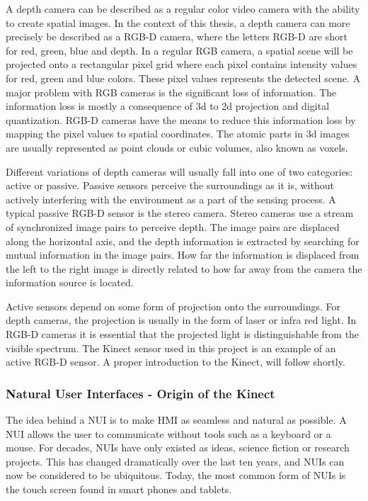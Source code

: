 A depth camera can be described as a regular color video camera with the ability to create spatial images. In the context of this thesis, a depth camera can  more precisely be described as a RGB-D camera, where the letters RGB-D are short for red, green, blue and depth. In a regular RGB camera, a spatial scene will be projected onto a rectangular pixel grid where each pixel contains intensity values for red, green and blue colors. These pixel values represents the detected scene. A major problem with RGB cameras is the significant loss of information. The information loss is mostly a consequence of 3d to 2d projection and digital quantization. RGB-D cameras have the means to reduce this information loss by mapping the pixel values to spatial coordinates. The atomic parts in 3d images are usually represented as point clouds or cubic volumes, also known as voxels.

Different variations of depth cameras will usually fall into one of two categories: active or passive. Passive sensors perceive the surroundings as it is, without actively interfering with the environment as a part of the sensing process. A typical passive RGB-D sensor is the stereo camera. Stereo cameras use a stream of synchronized image pairs to perceive depth. The image pairs are displaced along the horizontal axis, and the depth information is extracted by searching for mutual information in the image pairs. How far the information is displaced from the left to the right image is directly related to how far away from the camera the information source is located. 

Active sensors depend on some form of projection onto the surroundings. For depth cameras, the projection is usually in the form of laser or infra red light. In RGB-D cameras it is essential that the projected light is distinguishable from the visible spectrum. The Kinect sensor used in this project is an example of an active RGB-D sensor. A proper introduction to the Kinect, will follow shortly.

\subsubsection{Natural User Interfaces - Origin of the Kinect}

The idea behind a \ac{NUI} is to make \ac{HMI} as seamless and natural as possible. A \ac{NUI} allows the user to communicate without tools such as a keyboard or a mouse. For decades, \ac{NUI}s have only existed as ideas, science fiction or research projects. This has changed dramatically over the last ten years, and \ac{NUI}s can now be considered to be ubiquitous. Today, the most common form of \ac{NUI}s is the touch screen found in smart phones and tablets. 


